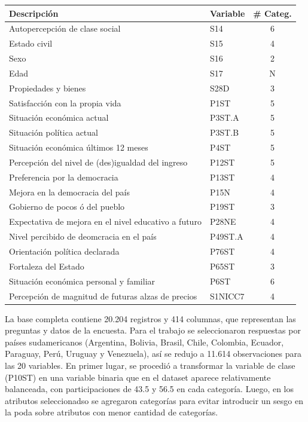 \documentclass[]{article}
\begin{document}
\begin{center}
	\begin{tabular}{|l|l|c|}\hline
		Descripción & Variable & \# Categ.\\ \hline
		Autopercepción de clase social & S14 & 6\\
		Estado civil & S15 & 4\\
		Sexo & S16 & 2\\
		Edad & S17 & N\\
		Propiedades y bienes & S28D & 3\\
		Satisfacción con la propia vida & P1ST & 5\\
		Situación económica actual & P3ST.A & 5\\
		Situación política actual & P3ST.B & 5\\
		Situación económica últimos 12 meses & P4ST & 5\\
		Percepción del nivel de (des)igualdad del ingreso & P12ST & 5\\
		Preferencia por la democracia & P13ST & 4\\
		Mejora en la democracia del país & P15N & 4\\
		Gobierno de pocos ó del pueblo & P19ST & 3\\
		Expectativa de mejora en el nivel educativo a futuro & P28NE & 4\\
		Nivel percibido de deomcracia en el país & P49ST.A & 4\\
		Orientación política declarada & P76ST & 4\\
		Fortaleza del Estado & P65ST & 3\\
		Situación económica personal y familiar & P6ST & 6\\
		Percepción de magnitud de futuras alzas de precios & S1NICC7 & 4\\ \hline
	\end{tabular}
\end{center}


La base completa contiene 20.204 registros y 414 columnas, que representan las preguntas y datos de la encuesta. Para el trabajo se seleccionaron respuestas por países sudamericanos (Argentina, Bolivia, Brasil, Chile, Colombia, Ecuador, Paraguay, Perú, Uruguay y Venezuela), así se redujo a 11.614 observaciones para las 20 variables. En primer lugar, se procedió a transformar la variable de clase (P10ST) en una variable binaria que en el dataset aparece relativamente balanceada, con participaciones de 43.5 y 56.5 en cada categoría. Luego, en los atributos seleccionadso se agregaron categorías para evitar introducir un sesgo en la poda sobre atributos con menor cantidad de categorías. 
\end{document}
